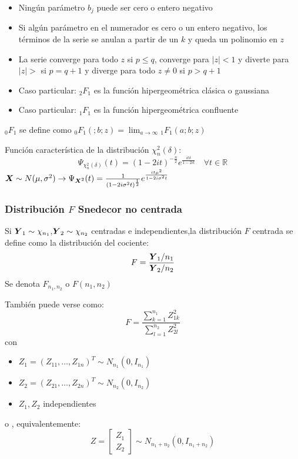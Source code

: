 \begin{nota}
  \begin{itemize}
  \item Ningún parámetro $b_j$ puede ser cero o entero negativo
  \item Si algún parámetro en el numerador es cero o un entero negativo, los términos de la serie se anulan a partir de un $k$ y queda un polinomio en $z$
  \item La serie converge para todo $z$ si $p \leq q$, converge para $|z| < 1$ y diverte para $|z|> $ si $p = q+1$ y diverge para todo $z\ne 0$ si $p>q+1$

  \item Caso particular: ${}_2F_1$ es la función hipergeométrica clásica o gaussiana
    \item Caso particular: ${}_1F_1$ es la función hipergeométrica confluente
  \end{itemize}
  \item ${}_0F_1$ se define como ${}_0F_1(;b;z) = \lim_{a\to \infty} {}_1F_1(a;b;z)$
\end{nota}


Función característica de la distribución $\chi_n^2(\delta)$:
\[
\Psi_{\chi_n^2(\delta)}(t) = (1-2it)^{-\frac{n}{2}} e^{\frac{it\delta}{1-2it}} \quad \forall t \in \mathbb R
\]
$\boldsymbol{X} \sim N(\mu,\sigma^2) \to \Psi_{\boldsymbol{X}^2}(t) = \frac{1}{(1-2i\sigma^2 t)^{\frac{1}{2}}} e^{\frac{it\mu^2}{1-2i\sigma^2 t}}$




\subsubsection{Distribución $F$ Snedecor no centrada}

\begin{ndef}
  Si $\boldsymbol{Y}_1\sim \chi_{n_1}$,$\boldsymbol{Y}_2 \sim \chi_{n_2}$ centradas e independientes,la distribución $F$ centrada se define como la distribución del cociente:
  \[
  F = \frac{\boldsymbol{Y}_1 / n_1}{\boldsymbol{Y}_2 / n_2}
  \]
  Se denota $F_{n_1,n_2}$ o $F(n_1,n_2)$
\end{ndef}
También puede verse como:
\[
F = \frac{\sum_{k=1}^{n_1} Z_{1k}^2}{\sum_{l=1}^{n_2} Z_{2l}^2}
\]
con
\begin{itemize}
\item $Z_1 = (Z_{11},\dots, Z_{1n})^T \sim N_{n_1}(0,I_{n_1})$
\item $Z_2 = (Z_{21},\dots, Z_{2n})^T \sim N_{n_2}(0,I_{n_2})$
  \item $Z_1,Z_2$ independientes
\end{itemize}
o , equivalentemente:
\[
Z = \begin{bmatrix}Z_1 \\ Z_2 \end{bmatrix} \sim N_{n_1+n_2}(0,I_{n_1+n_2})
\]

